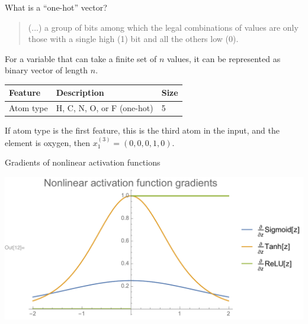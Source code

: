 \documentclass[compress]{beamer}
\begin{document}
\begin{frame}{What is a ``one-hot'' vector?}
  \begin{quote}
    (...) a group of bits among which the legal combinations of values are only those with a single high (1) bit and all the others low (0).
  \end{quote}
  For a variable that can take a finite set of \(n\) values, it can be represented as binary vector of length \(n\).
  \begin{table}[htbp]
    \centering
    \begin{tabular}{@{}lll@{}}
      \toprule
      Feature & Description & Size \\ \midrule
      Atom type & H, C, N, O, or F (one-hot) & 5 \\ \bottomrule
    \end{tabular}
  \end{table}
  If atom type is the first feature, this is the third atom in the input, and the element is oxygen, then \(x_{1}^{(3)} = (0, 0, 0, 1, 0)\).
\end{frame}

\begin{frame}{Gradients of nonlinear activation functions}
  \begin{center}
    \includegraphics[width=1.00\textwidth]{./figures/nonlinear_activation_gradients.pdf}
  \end{center}
\end{frame}

\end{document}

